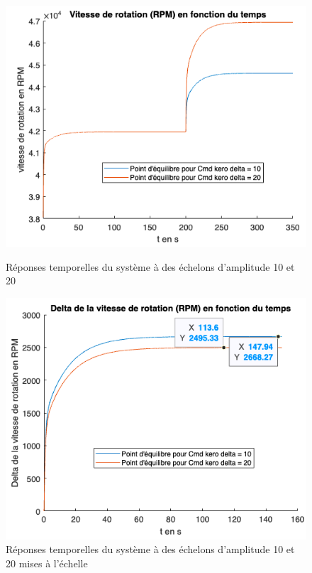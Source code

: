 \documentclass[12pt]{report}
\begin{document}
\begin{figure}[!h]
  \vspace{0.3cm}
  \centering
  \includegraphics[scale=0.55]{fig/step_response_delta10-20.png}
  \caption{Réponses temporelles du système à des échelons d'amplitude 10 et 20}
  \vspace{0.7cm}
  \includegraphics[scale=0.55]{fig/step_response_delta10-20_scaled.png}
  \caption{Réponses temporelles du système à des échelons d'amplitude 10 et 20 mises à l'échelle}
  \vspace{0.3cm}
\end{figure}
\end{document}
